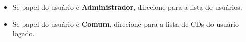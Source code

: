 \vspace{0.3cm}

\begin{itemize}

\item  Se papel  do usuário  é  {\bf Administrador},  direcione para  a lista  de
  usuários.

\vspace{0.3cm}

\item Se papel do usuário é {\bf Comum}, direcione para a lista de CDs do usuário
  logado.

\end{itemize}




 






 









